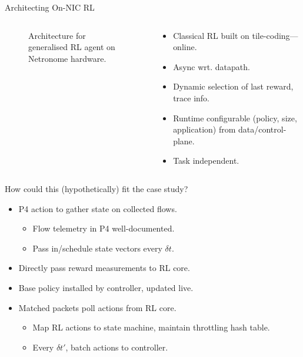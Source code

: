 \documentclass[aspectratio=169,xcolor={dvipsnames}
]{beamer}
\begin{document}
\begin{frame}{Architecting On-NIC RL}
\begin{columns}
\begin{column}{0.6\linewidth}
\begin{figure}
{}
				\caption{Architecture for generalised RL agent on Netronome hardware.}
			\end{figure}
		\end{column}
		\begin{column}{0.4\linewidth}
			\begin{itemize}
				\item Classical RL built on tile-coding---\alert{online}.
				\item Async wrt. datapath.
				\item Dynamic selection of last reward, trace info.
				\item \alert{Runtime configurable} (policy, size, application) from data/control-plane.
				\item \alert{Task independent.}
			\end{itemize}
		\end{column}
	\end{columns}
\end{frame}

\begin{frame}{How could this (hypothetically) fit the case study?}
	\begin{itemize}
		\item P4 action to gather state on collected flows.
		\begin{itemize}
			\item Flow telemetry in P4 well-documented.
			\item Pass in/schedule state vectors every $\delta{}t$.
		\end{itemize}
		\item Directly pass reward measurements to RL core.
		\item Base policy installed by controller, updated live.
		\item Matched packets poll actions from RL core.
		\begin{itemize}
			\item Map RL actions to state machine, maintain throttling hash table.
			\item Every $\delta{}t'$, batch actions to controller.
		\end{itemize}
	\end{itemize}
\end{frame}
\end{document}

